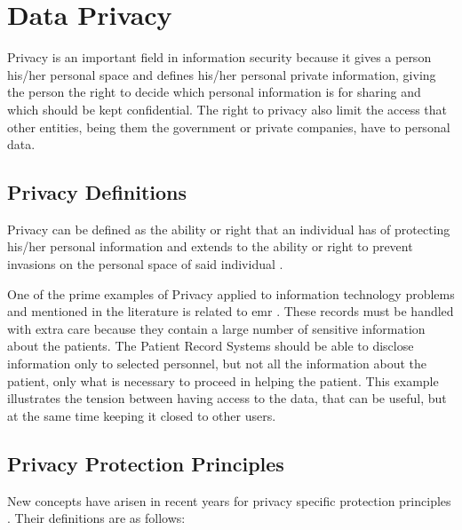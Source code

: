\section{Data Privacy} 
\label{sec:DataPrivacy}

Privacy is an important field in information security because it gives a person his/her personal space and defines his/her personal private information, giving the person the right to decide which personal information is for sharing and which should be kept confidential. The right to privacy also limit the access that other entities, being them the government or private companies, have to personal data.


\subsection{Privacy Definitions}
\label{ssec:PrivacyDefinitions}


Privacy can be defined as the ability or right that an individual has of protecting his/her personal information and extends to the ability or right to prevent invasions on the personal space of said individual \cite{anderson2008security}.

One of the prime examples of Privacy applied to information technology problems and mentioned in the literature is related to \ac{emr} \cite{Lu2014}. These records must be handled with extra care because they contain a large number of sensitive information about the patients. The Patient Record Systems should be able to disclose information only to selected personnel, but not all the information about the patient, only what is necessary to proceed in helping the patient. This example illustrates the tension between having access to the data, that can be useful, but at the same time keeping it closed to other users.



\subsection{Privacy Protection Principles}
\label{ssec:PrivacyProtectionGoals}

New concepts have arisen in recent years for privacy specific protection principles \cite{Danezis2015}. Their definitions are as follows:

